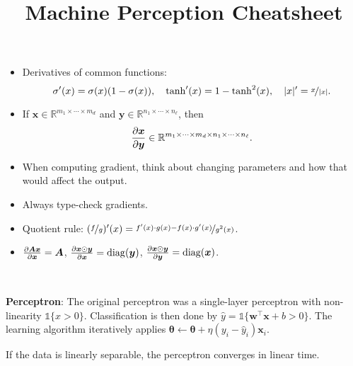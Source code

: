 \documentclass{article}
\title{Machine Perception Cheatsheet}
\newcommand{\lft}{\mathopen{}\mathclose\bgroup\left}
\newcommand{\rgt}{\aftergroup\egroup\right}
\newcommand{\R}{\mathbb{R}}
\renewcommand{\vec}[1]{\bm{#1}}
\newcommand{\mat}[1]{\bm{#1}}
\newenvironment{topic}[1]
{\textbf{\sffamily \colorbox{black}{\rlap{\textbf{\textcolor{white}{#1}}}\hspace{\linewidth}\hspace{-2\fboxsep}}} \\ \vspace{0.2cm}}
{}
\begin{document}
\setlength{\columnsep}{0.15cm}


\begin{multicols*}{2}

    \begin{itemize}
        \item Derivatives of common functions: \[
                  \sigma'(x) = \sigma(x) (1 - \sigma(x)), \quad \tanh'(x) = 1 - \tanh^2(x), \quad |x|' = \nicefrac{x}{|x|}.
              \]
        \item If $\vec{x} \in \R^{m_1 \times \cdots \times m_d}$ and $\vec{y} \in \R^{n_1 \times \cdots \times
                      n_\ell}$, then \[
                  \pdv{\vec{x}}{\vec{y}} \in \R^{m_1 \times \cdots \times m_d \times n_1 \times \cdots \times n_\ell}.
              \]
        \item When computing gradient, think about changing parameters and how that would affect the output.
        \item Always type-check gradients.
        \item Quotient rule: $(\nicefrac{f}{g})'(x) = \nicefrac{f'(x)\cdot g(x) - f(x)\cdot g'(x)}{g^2(x)}$.
        \item $\pdv{\mat{A} \vec{x}}{\vec{x}} = \mat{A}$, $\pdv{\vec{x} \odot \vec{y}}{\vec{x}} = \mathrm{diag}(\vec{y})$, $\pdv{\vec{x} \odot \vec{y}}{\vec{y}} = \mathrm{diag}(\vec{x})$.

    \end{itemize}


    \begin{topic}{Neural networks}

        \textbf{Perceptron}: The original perceptron was a single-layer perceptron with non-linearity
        $\mathds{1}\{ x > 0 \}$. Classification is then done by $\hat{y} = \mathds{1}\{ \vec{w}^\top
            \vec{x} + b > 0 \}$. The learning algorithm iteratively applies $\vec{\theta} \gets
            \vec{\theta} + \eta(y_i - \hat{y}_i) \vec{x}_i$. %

        If the data is linearly separable, the perceptron converges in linear time.


\end{topic}
\end{multicols*}
\end{document}
